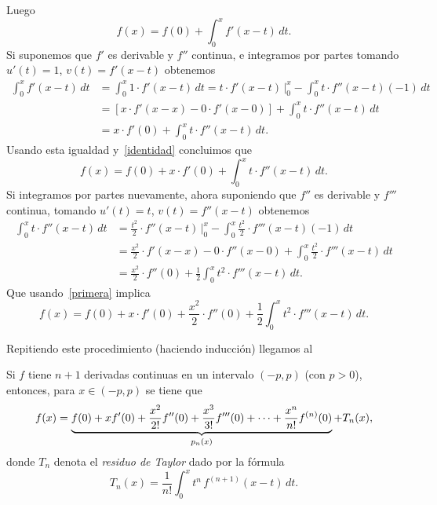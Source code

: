 Luego
\begin{equation}\label{identidad}
 f(x) = f(0) + \int_0^x f'(x-t) \, dt.
\end{equation}
Si suponemos que $f'$ es derivable y $f''$ continua, e integramos por partes tomando $u'(t) = 1$, $v(t) = f'(x-t)$ obtenemos
\begin{align*}
 \int_0^x f'(x-t) \, dt &= \int_0^x 1 \cdot f'(x-t)\, dt
                         = t \cdot f'(x-t) \, \Big|_0^x - \int_0^x t \cdot f''(x-t) (-1) \, dt \\
&= \left[ x \cdot f'(x-x) - 0 \cdot f'(x-0) \right] + \int_0^x t \cdot f''(x-t) \, dt \\
& = x \cdot f'(0) + \int_0^x t \cdot f''(x-t) \, dt.
\end{align*}
Usando esta igualdad y~\eqref{identidad} concluimos que
\begin{equation}\label{primera}
 f(x) = f(0) + x \cdot f'(0) + \int_0^x t \cdot f''(x-t) \, dt.
\end{equation}
Si integramos por partes nuevamente, ahora suponiendo que $f''$ es derivable y $f'''$ continua, tomando $u'(t) = t$, $v(t) = f''(x-t)$ obtenemos
\begin{align*}
 \int_0^x t \cdot f''(x-t) \, dt &= \frac{t^2}{2} \cdot f''(x-t) \, \Big|_0^x - \int_0^x \frac{t^2}2 \cdot f'''(x-t) (-1) \, dt \\
&= \frac{x^2}2 \cdot f'(x-x) - 0 \cdot f''(x-0) + \int_0^x \frac{t^2}2 \cdot f'''(x-t) \, dt \\
& = \frac{x^2}2 \cdot f''(0) + \frac12 \int_0^x t^2 \cdot f'''(x-t) \, dt.
\end{align*}
Que usando~\eqref{primera} implica
\begin{equation}\label{segunda}
 f(x) = f(0) + x \cdot f'(0) + \frac{x^2}2 \cdot f''(0) +\frac12 \int_0^x t^2 \cdot f'''(x-t) \, dt.
\end{equation}

Repitiendo este procedimiento (haciendo inducción) llegamos al

\begin{theorem}
Si $f$ tiene $n+1$ derivadas continuas en un intervalo $(-p,p)$  (con $p>0$), entonces, para $x \in (-p,p)$ se tiene que
\[
\displaystyle f(x) = 
\underbrace{f(0) + x f'(0) + \frac{x^2}{2!} f''(0) + \frac{x^3}{3!} f'''(0) + \dots 
 +\frac{x^n}{n!} f^{(n)}(0)}_{p_n(x)}
 + T_n(x),
\]
donde $T_n$ denota el \emph{residuo de Taylor} dado por la fórmula
\[
 T_n(x) = \frac{1}{n!} \int_0^x t^n \, f^{(n+1)}(x-t)\, dt.
\]
\end{theorem}


